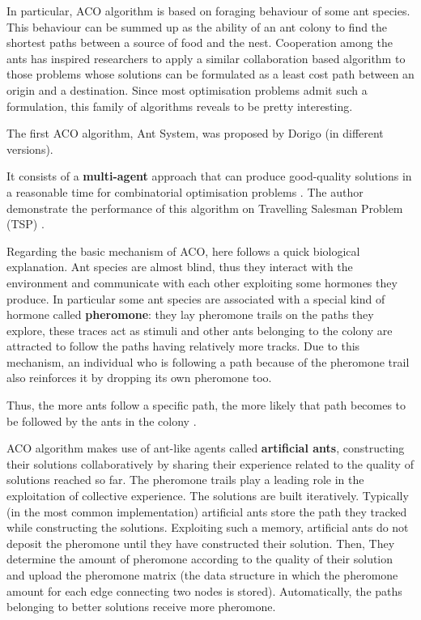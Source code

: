 \documentclass[10pt]{article}
\begin{document}
In particular, ACO algorithm  is based on  foraging  behaviour  of  some  ant species.  
This behaviour  can  be  summed up as the ability of an ant colony to find the shortest  paths between  a source of food  and  the nest.
Cooperation  among  the  ants  has inspired researchers to apply a similar collaboration based algorithm to those problems whose solutions can be formulated as a least cost path between an origin and a destination.
Since most optimisation problems  admit such a formulation, this family of algorithms reveals to be pretty interesting.

The first ACO algorithm, Ant System, was proposed by Dorigo \cite{cinque, sei, sette, otto, nove} (in different versions).

It consists of a \textbf{multi-agent} approach that can produce good-quality solutions in a reasonable time for combinatorial optimisation problems \cite{cinque}. 
The author demonstrate the performance of this algorithm on Travelling Salesman  Problem  (TSP) \cite{sei}. 

Regarding the basic mechanism of ACO, here follows a quick biological explanation.
Ant species are almost blind, thus they interact with the environment and communicate with each  other  exploiting some hormones they produce.  
In particular some  ant species are associated with a special kind of hormone called \textbf{pheromone}: they lay pheromone trails on the paths they explore, these traces act as stimuli and other ants belonging to the colony are attracted to follow the paths having relatively more tracks.  
Due to this mechanism, an individual who is following a  path  because of the  pheromone  trail also reinforces  it  by dropping its own pheromone too.  

Thus, the  more ants  follow  a  specific  path,  the  more  likely  that  path  becomes  to  be  followed  by  the  ants  in the colony \cite{ cinque,otto, nove}.  

ACO  algorithm  makes use  of ant-like agents called \textbf{artificial ants}, constructing their solutions collaboratively by sharing their experience related to the quality of solutions reached so far.
The pheromone trails play  a  leading  role  in  the  exploitation of collective experience.
The solutions are built iteratively.
Typically (in the most common implementation) artificial  ants  store  the  path  they  tracked while  constructing  the solutions.  
Exploiting such a memory, artificial  ants  do not deposit  the pheromone until they have constructed their solution. 
Then, They determine the amount of pheromone according  to  the  quality  of  their  solution  and upload the pheromone matrix (the data structure in which the pheromone amount for each edge connecting two nodes is stored). 
Automatically, the paths belonging to better solutions receive  more pheromone.
\end{document}

